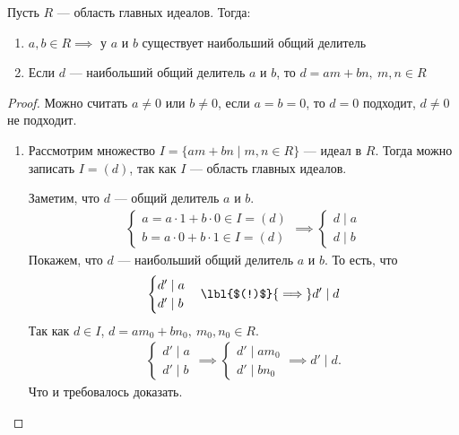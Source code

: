 \begin{theorem-non}
    Пусть $R$ --- область главных идеалов. Тогда:

    \begin{enumerate}
        \item $a, b \in R \implies$ у $a$ и $b$ существует наибольший общий делитель
        
        \item Если $d$ --- наибольший общий делитель $a$ и $b$, то $d = am + bn,~m, n \in R$
    \end{enumerate}
\end{theorem-non}

\begin{proof}
    
    Можно считать $a \neq 0$ или $b \neq 0$, если $a = b = 0$, то $d = 0$ подходит, $d \neq 0$ не подходит.

    \begin{enumerate}
        \item Рассмотрим множество $I = \{ am + bn \mid m, n \in R \}$ --- идеал в $R$. Тогда можно записать $I = (d)$, так как $I$ --- область главных идеалов. 
        
        Заметим, что $d$ --- общий делитель $a$ и $b$. 
        \begin{gather*}
            \begin{cases}
                a = a \cdot 1 + b \cdot 0 \in I = (d)\\
                b = a \cdot 0 + b \cdot 1 \in I = (d)
            \end{cases} \implies \begin{cases}
                d \mid a\\
                d \mid b
            \end{cases}
        \end{gather*}
        Покажем, что $d$ --- наибольший общий делитель $a$ и $b$.
        То есть, что 
        \begin{gather*}
            \begin{cases}
                d' \mid a\\
                d' \mid b
            \end{cases} \lbl{$(!)$}{\implies} d' \mid d
        \end{gather*}
        Так как $d \in I$, $d = a m_0 + b n_0,~m_0, n_0 \in R$.
        \begin{gather*}
            \begin{cases}
                d' \mid a\\
                d' \mid b
            \end{cases} \implies \begin{cases}
                d' \mid a m_0\\
                d' \mid b n_0
            \end{cases} \implies d' \mid d.
        \end{gather*}
        Что и требовалось доказать.


\end{enumerate}
\end{proof}
